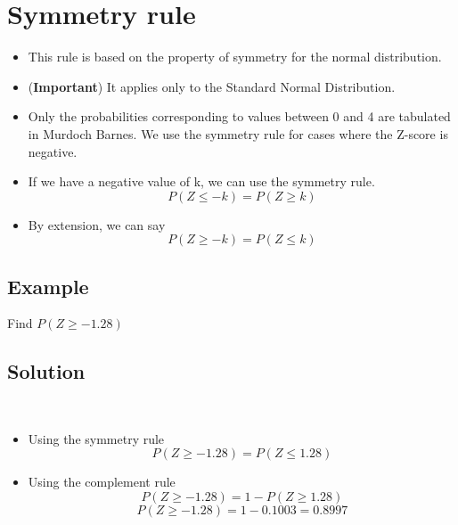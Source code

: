 \documentclass[a4paper,12pt]{article}
\begin{document}
	\newpage
\section*{Symmetry rule}
\begin{itemize}
\item
This rule is based on the property of symmetry for the normal distribution. 
\item (\textbf{Important}) It applies only to the Standard Normal Distribution.
\item
Only the probabilities corresponding to values between 0 and 4 are tabulated in Murdoch Barnes. We use the symmetry rule for cases where the Z-score is negative.
\item
If we have a negative value of k, we can use the symmetry rule.
\[P(Z \leq -k) = P(Z \geq k) \]
\item By extension, we can say
\[P(Z \geq -k) = P(Z \leq k) \]
\end{itemize}

\subsection*{Example}
Find $P(Z \geq -1.28)$
\subsection*{Solution}\
\begin{itemize}
\item Using the symmetry rule
\[P(Z \geq -1.28) = P(Z \leq 1.28) \]
\item Using the complement rule
\[P(Z \geq -1.28) = 1 - P(Z \geq 1.28) \]
\[P(Z \geq -1.28) = 1 - 0.1003 = 0.8997 \]
\end{itemize}



\end{document}
